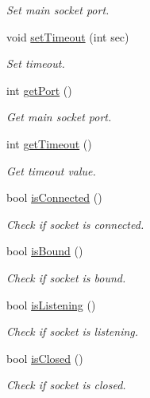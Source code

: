 \begin{DoxyCompactItemize}
\begin{DoxyCompactList}\small\item\em Set main socket port. \end{DoxyCompactList}\item 
void \hyperlink{classSocket_af77803439a08c530d56c6e47392db835}{set\+Timeout} (int sec)
\begin{DoxyCompactList}\small\item\em Set timeout. \end{DoxyCompactList}\item 
int \hyperlink{classSocket_ab1b21cc98297c4b22638131805559185}{get\+Port} ()
\begin{DoxyCompactList}\small\item\em Get main socket port. \end{DoxyCompactList}\item 
int \hyperlink{classSocket_a46dab09a0a8bc833b335b4ffbe251532}{get\+Timeout} ()
\begin{DoxyCompactList}\small\item\em Get timeout value. \end{DoxyCompactList}\item 
bool \hyperlink{classSocket_a60c76a4c1e26192218d598b63cbb97b9}{is\+Connected} ()
\begin{DoxyCompactList}\small\item\em Check if socket is connected. \end{DoxyCompactList}\item 
bool \hyperlink{classSocket_af4463bb00360df09c545e45f38f555be}{is\+Bound} ()
\begin{DoxyCompactList}\small\item\em Check if socket is bound. \end{DoxyCompactList}\item 
bool \hyperlink{classSocket_a43012c8a63f3dce04b3e8620e9057a0b}{is\+Listening} ()
\begin{DoxyCompactList}\small\item\em Check if socket is listening. \end{DoxyCompactList}\item 
bool \hyperlink{classSocket_a7e54aa5a8807a44096258b41fd27ecf3}{is\+Closed} ()
\begin{DoxyCompactList}\small\item\em Check if socket is closed. \end{DoxyCompactList}\end{DoxyCompactItemize}
